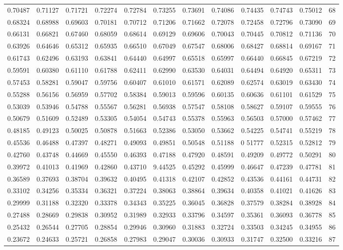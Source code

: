 \begin{center}
\begin{tabular}{|rrrrrrrrrrr|r|}
0.70487&0.71127&0.71721&0.72274&0.72784&0.73255&0.73691&0.74086&0.74435&0.74743&0.75012&68\\
0.68324&0.68988&0.69603&0.70181&0.70712&0.71206&0.71662&0.72078&0.72458&0.72796&0.73090&69\\[5pt]
0.66131&0.66821&0.67460&0.68059&0.68614&0.69129&0.69606&0.70043&0.70445&0.70812&0.71136&70\\
0.63926&0.64646&0.65312&0.65935&0.66510&0.67049&0.67547&0.68006&0.68427&0.68814&0.69167&71\\
0.61743&0.62496&0.63193&0.63841&0.64440&0.64997&0.65518&0.65997&0.66440&0.66845&0.67219&72\\
0.59591&0.60380&0.61110&0.61788&0.62411&0.62990&0.63530&0.64031&0.64494&0.64920&0.65311&73\\
0.57453&0.58281&0.59047&0.59756&0.60407&0.61010&0.61571&0.62089&0.62574&0.63019&0.63430&74\\[5pt]
0.55288&0.56156&0.56959&0.57702&0.58384&0.59013&0.59596&0.60135&0.60636&0.61101&0.61529&75\\
0.53039&0.53946&0.54788&0.55567&0.56281&0.56938&0.57547&0.58108&0.58627&0.59107&0.59555&76\\
0.50679&0.51609&0.52489&0.53305&0.54054&0.54743&0.55378&0.55963&0.56503&0.57000&0.57462&77\\
0.48185&0.49123&0.50025&0.50878&0.51663&0.52386&0.53050&0.53662&0.54225&0.54741&0.55219&78\\
0.45536&0.46488&0.47397&0.48271&0.49093&0.49851&0.50548&0.51188&0 51777&0.52315&0.52812&79\\[5pt]
0.42760&0.43748&0.44669&0.45550&0.46393&0.47188&0.47920&0.48591&0.49209&0.49772&0.50291&80\\
0.39972&0.41013&0.41969&0.42860&0.43710&9.44525&0.45292&0.45999&0.46647&0.47239&0.47781&81\\
0.36589&0.37693&0.38704&0.39632&0.40495&0.41318&0.42107&0.42852&0.43536&0.44161&0.44731&82\\
0.33102&0.34256&0.35334&0.36321&0.37224&0.38063&0.38864&0.39634&0.40358&0.41021&0.41626&83\\
0.29999&0.31188&0.32320&0.33378&0.34343&0.35225&0.36045&0.36828&0.37579&0.38284&0.38928&84\\[5pt]
0.27488&0.28669&0.29838&0.30952&0.31989&0.32933&0.33796&0.34597&0.35361&0.36093&0.36778&85\\
0.25432&0.26544&0.27705&0.28854&0.29946&0.30960&0.31883&0.32724&0.33503&0.34245&0.34955&86\\
0.23672&0.24633&0.25721&0.26858&0.27983&0.29047&0.30036&0.30933&0.31747&0.32500&0.33216&87\\

\end{tabular}
\end{center}
